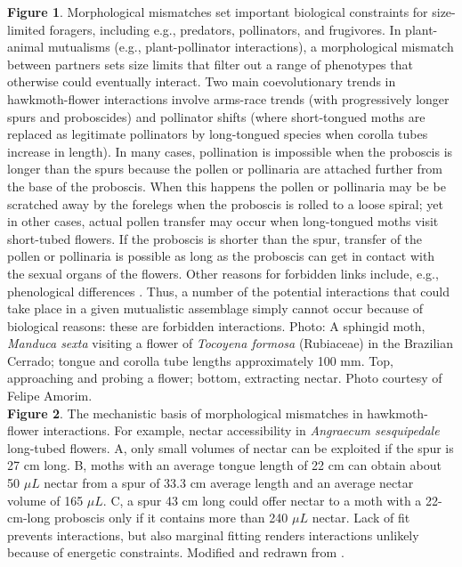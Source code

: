 \documentclass[a4paper,12pt]{article}
\begin{document}
\textbf{Figure 1}. Morphological mismatches set important biological constraints for size-limited foragers, including e.g., predators, pollinators, and frugivores. In plant-animal mutualisms (e.g., plant-pollinator interactions), a morphological mismatch between partners sets size limits that filter out a range of phenotypes that otherwise could eventually interact. Two main coevolutionary trends in hawkmoth-flower interactions involve arms-race trends (with progressively longer spurs and proboscides) and pollinator shifts (where short-tongued moths are replaced as legitimate pollinators by long-tongued species when corolla tubes increase in length). In many cases, pollination is impossible when the proboscis is longer than the spurs because the pollen or pollinaria are attached further from the base of the proboscis. When this happens the pollen or pollinaria may be be scratched away by the forelegs when the proboscis is rolled to a loose spiral; yet in other cases, actual pollen transfer may occur when long-tongued moths visit short-tubed flowers. If the proboscis is shorter than the spur, transfer of the pollen or pollinaria is possible as long as the proboscis can get in contact with the sexual organs of the flowers. Other reasons for forbidden links include, e.g., phenological differences \citep{BasJor:2014}. Thus, a number of the potential interactions that could take place in a given mutualistic assemblage simply cannot occur because of biological reasons: these are forbidden interactions. Photo: A sphingid moth, \textit{Manduca sexta} visiting a flower of \textit{Tocoyena formosa} (Rubiaceae) in the Brazilian Cerrado; tongue and corolla tube lengths approximately 100 mm. Top, approaching and probing a flower; bottom, extracting nectar. Photo courtesy of Felipe Amorim.  \\

\textbf{Figure 2}. The mechanistic basis of morphological mismatches in hawkmoth-flower interactions. For example, nectar accessibility in \textit{Angraecum sesquipedale} long-tubed flowers. A,  only small volumes of nectar can be exploited if the spur is 27 cm long. B, moths with an average tongue length of 22 cm can obtain about 50 $\mu L$ nectar from a spur of 33.3 cm average length and an average nectar volume of 165 $\mu L$. C, a spur 43 cm long could offer nectar to a moth with a 22-cm-long proboscis only if it contains more than 240 $\mu L$ nectar. Lack of fit prevents interactions, but also marginal fitting renders interactions unlikely because of energetic constraints. Modified and redrawn from \citep{Arditti:2012}. \\
\end{document}
